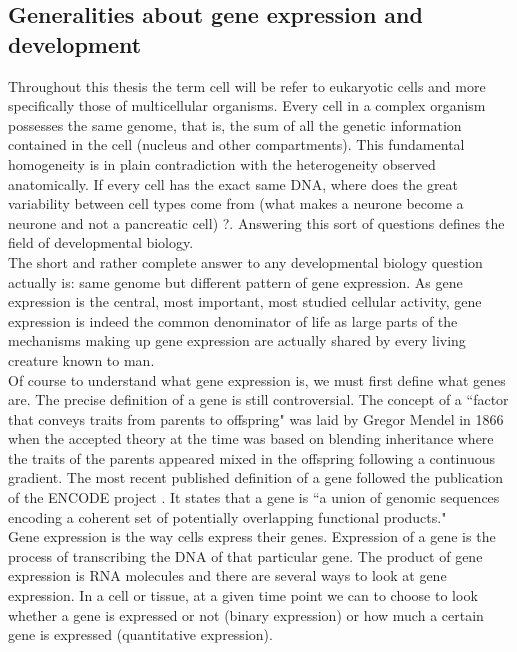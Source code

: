      \subsection{Generalities about gene expression and development}  
     Throughout this thesis the term cell will be refer to eukaryotic cells and more specifically those of multicellular organisms. Every cell in a complex organism possesses the same genome, that is, the sum of all the genetic information contained in the cell (nucleus and other compartments). This fundamental homogeneity is in plain contradiction with the heterogeneity observed anatomically. If every cell has the exact same DNA, where does the great variability between cell types come from (what makes a neurone become a neurone and not a pancreatic cell) ?. Answering this sort of questions defines the field of developmental biology.\\
     
     The short and rather complete answer to any developmental biology question actually is: same genome but different pattern of gene expression. As gene expression is the central, most important, most studied cellular activity, gene expression is indeed the common denominator of life as large parts of the mechanisms making up gene expression are actually shared by every living creature known to man.\\

     Of course to understand what gene expression is, we must first define what genes are. The precise definition of a gene is still controversial. The concept of a ``factor that conveys traits from parents to offspring" was laid by Gregor Mendel in 1866 \cite{mendel66} when the accepted theory at the time was based on blending inheritance where the traits of the parents appeared mixed in the offspring following a continuous gradient. The most recent published definition of a gene followed the publication of the ENCODE project \cite{feingold04}. It states that a gene is ``a union of genomic sequences encoding a coherent set of potentially overlapping functional products."\\

	Gene expression is the way cells express their genes. Expression of a gene is the process of transcribing the DNA of that particular gene. The product of gene expression is RNA molecules and there are several ways to look at gene expression. In a cell or tissue, at a given time point we can to choose to look whether a gene is expressed or not (binary expression) or how much a certain gene is expressed (quantitative expression).\\
	
